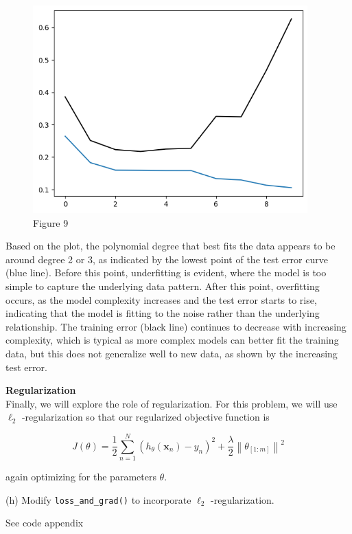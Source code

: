 \documentclass[letterpaper]{article}
\theoremstyle{definition}
\begin{document}
\begin{enumerate}
\color{teal}
\begin{figure}[htbp]
\centering
\includegraphics[width=400]{../assets/hw1_fig9.png}
\caption{Figure 9}
\end{figure}
Based on the plot, the polynomial degree that best fits the data appears to be around degree 2 or 3, as indicated by the lowest point of the test error curve (blue line). Before this point, underfitting is evident, where the model is too simple to capture the underlying data pattern. After this point, overfitting occurs, as the model complexity increases and the test error starts to rise, indicating that the model is fitting to the noise rather than the underlying relationship. The training error (black line) continues to decrease with increasing complexity, which is typical as more complex models can better fit the training data, but this does not generalize well to new data, as shown by the increasing test error.
\color{black}

\textbf{Regularization} \\[0pt]

Finally, we will explore the role of regularization. For this problem, we will use \(\ell_{2}\)
-regularization so that our regularized objective function is

$$
   J(\theta)=\frac{1}{2} \sum_{n=1}^{N}\left(h_{\theta}\left(\mathbf{x}_{n}\right)-y_{n}\right)^{2}+\frac{\lambda}{2}\left\|\theta_{[1: m]}\right\|^{2}
   $$

again optimizing for the parameters \(\theta\).

(h) Modify \texttt{loss\_and\_grad()} to incorporate \(\ell_{2}\) -regularization.

\color{teal}
See code appendix
\color{black}
\end{enumerate}
\end{document}
